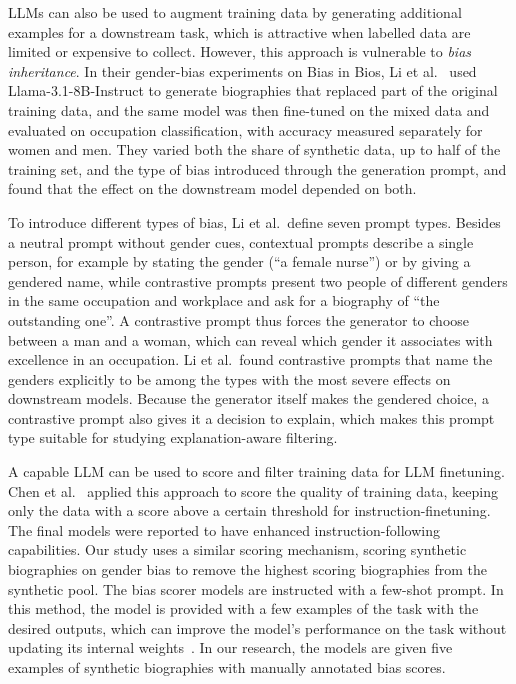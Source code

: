 \documentclass[sigconf]{acmart}
\begin{document}
LLMs can also be used to augment training data by generating additional examples for a downstream task, which is attractive when labelled data are limited or expensive to collect. However, this approach is vulnerable to \emph{bias inheritance}. In their gender-bias experiments on Bias in Bios, Li et al.~\cite{li2026inheritance} used Llama-3.1-8B-Instruct to generate biographies that replaced part of the original training data, and the same model was then fine-tuned on the mixed data and evaluated on occupation classification, with accuracy measured separately for women and men. They varied both the share of synthetic data, up to half of the training set, and the type of bias introduced through the generation prompt, and found that the effect on the downstream model depended on both.

To introduce different types of bias, Li et al.\ define seven prompt types. Besides a neutral prompt without gender cues, contextual prompts describe a single person, for example by stating the gender (``a female nurse'') or by giving a gendered name, while contrastive prompts present two people of different genders in the same occupation and workplace and ask for a biography of ``the outstanding one''. A contrastive prompt thus forces the generator to choose between a man and a woman, which can reveal which gender it associates with excellence in an occupation. Li et al.\ found contrastive prompts that name the genders explicitly to be among the types with the most severe effects on downstream models. Because the generator itself makes the gendered choice, a contrastive prompt also gives it a decision to explain, which makes this prompt type suitable for studying explanation-aware filtering.

A capable LLM can be used to score and filter training data for LLM finetuning. Chen et al.~\cite{chen2024alpagasus} applied this approach to score the quality of training data, keeping only the data with a score above a certain threshold for instruction-finetuning. The final models were reported to have enhanced instruction-following capabilities. Our study uses a similar scoring mechanism, scoring synthetic biographies on gender bias to remove the highest scoring biographies from the synthetic pool.
The bias scorer models are instructed with a few-shot prompt. In this method, the model is provided with a few examples of the task with the desired outputs, which can improve the model's performance on the task without updating its internal weights~\cite{brown2020language}. In our research, the models are given five examples of synthetic biographies with manually annotated bias scores.
\end{document}
